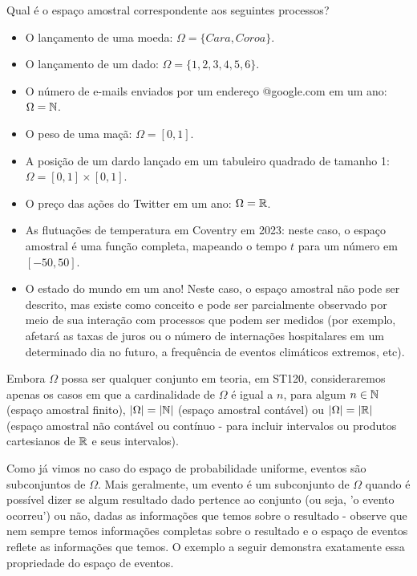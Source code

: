 \begin{example}
Qual é o espaço amostral correspondente aos seguintes processos?
\begin{itemize}
    \item O lançamento de uma moeda: $\Omega=\{Cara, Coroa\}$.
    \item O lançamento de um dado: $\Omega=\{1,2,3,4,5,6\}$.
    \item O número de e-mails enviados por um endereço @google.com em um ano: $\Omega=\mathbb{N}$.
    \item O peso de uma maçã: $\Omega=[0,1]$.
    \item A posição de um dardo lançado em um tabuleiro quadrado de tamanho 1: $\Omega=[0,1]\times[0,1]$.
    \item O preço das ações do Twitter em um ano: $\Omega=\mathbb{R}$.
    \item As flutuações de temperatura em Coventry em 2023: neste caso, o espaço amostral é uma função completa, mapeando o tempo $t$ para um número em $[-50,50]$.
    \item O estado do mundo em um ano! Neste caso, o espaço amostral não pode ser descrito, mas existe como conceito e pode ser parcialmente observado por meio de sua interação com processos que podem ser medidos (por exemplo, afetará as taxas de juros ou o número de internações hospitalares em um determinado dia no futuro, a frequência de eventos climáticos extremos, etc).
\end{itemize}
\end{example}

\begin{remark}
   Embora $\Omega$ possa ser qualquer conjunto em teoria, em ST120, consideraremos apenas os casos em que a cardinalidade de $\Omega$ é igual a $n$, para algum $n\in\mathbb{N}$ (espaço amostral finito), $|\Omega|=|\mathbb{N}|$ (espaço amostral contável) ou $|\Omega|=|\mathbb{R}|$ (espaço amostral não contável ou contínuo - para incluir intervalos ou produtos cartesianos de $\mathbb{R}$ e seus intervalos).
\end{remark}

Como já vimos no caso do espaço de probabilidade uniforme, eventos são subconjuntos de $\Omega$. Mais geralmente, um evento é um subconjunto de $\Omega$ quando é possível dizer se algum resultado dado pertence ao conjunto (ou seja, 'o evento ocorreu') ou não, dadas as informações que temos sobre o resultado - observe que nem sempre temos informações completas sobre o resultado e o espaço de eventos reflete as informações que temos. O exemplo a seguir demonstra exatamente essa propriedade do espaço de eventos.

